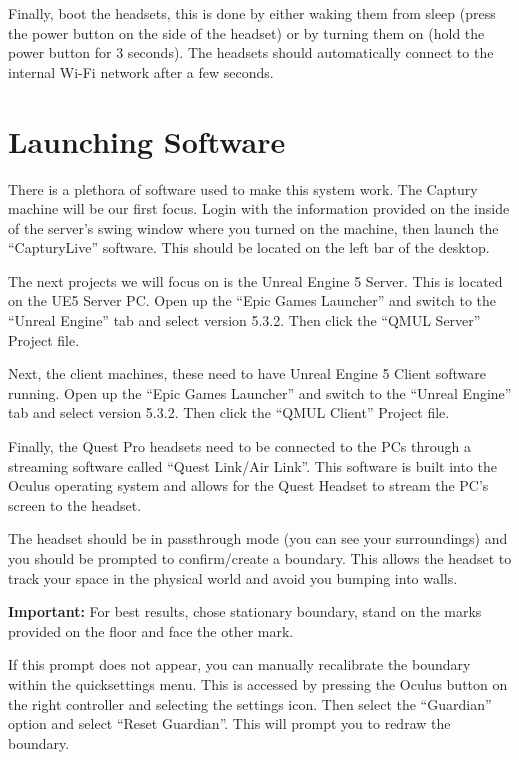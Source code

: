 Finally, boot the headsets, this is done by either waking them from sleep (press the power button on the side of the headset) or by turning them on (hold the power button for 3 seconds). The headsets should automatically connect to the internal Wi-Fi network after a few seconds.

\section{Launching Software}
There is a plethora of software used to make this system work. The Captury machine will be our first focus. Login with the information provided on the inside of the server's swing window where you turned on the machine, then launch the ``CapturyLive'' software. This should be located on the left bar of the desktop.

The next projects we will focus on is the Unreal Engine 5 Server. This is located on the UE5 Server PC. Open up the ``Epic Games Launcher'' and switch to the ``Unreal Engine'' tab and select version 5.3.2. Then click the ``QMUL Server'' Project file.

Next, the client machines, these need to have Unreal Engine 5 Client software running. Open up the ``Epic Games Launcher'' and switch to the ``Unreal Engine'' tab and select version 5.3.2. Then click the ``QMUL Client'' Project file.

Finally, the Quest Pro headsets need to be connected to the PCs through a streaming software called ``Quest Link/Air Link''. This software is built into the Oculus operating system and allows for the Quest Headset to stream the PC's screen to the headset. 

The headset should be in passthrough mode (you can see your surroundings) and you should be prompted to confirm/create a boundary. This allows the headset to track your space in the physical world and avoid you bumping into walls. 

\begin{tcolorbox}
    \textbf{Important:} For best results, chose stationary boundary, stand on the marks provided on the floor and face the other mark.
\end{tcolorbox}

If this prompt does not appear, you can manually recalibrate the boundary within the quicksettings menu. This is accessed by pressing the Oculus button on the right controller and selecting the settings icon. Then select the ``Guardian'' option and select ``Reset Guardian''. This will prompt you to redraw the boundary.

